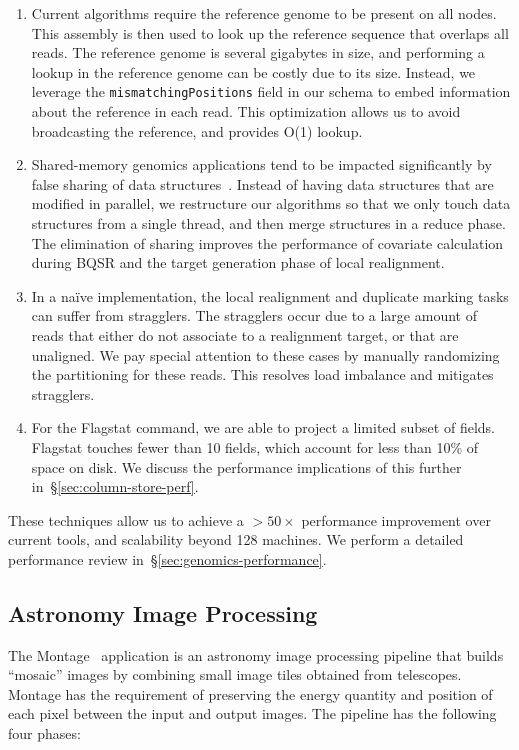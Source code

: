\documentclass{acm_proc_article-sp}
\begin{document}
\begin{enumerate}
\item Current algorithms require the reference genome to be present on all nodes. This assembly is then used to
look up the reference sequence that overlaps all reads. The reference genome is several gigabytes in
size, and performing a lookup in the reference genome can be costly due to its size. Instead, we leverage
the \texttt{mismatchingPositions} field in our schema to embed information about the reference in each read. This
optimization allows us to avoid broadcasting the reference, and provides O(1) lookup.
\item Shared-memory genomics applications tend to be impacted significantly by false sharing of data
\linebreak structures~\cite{zaharia11}. Instead of having data structures that are modified in parallel, we
restructure our algorithms so that we only touch data structures from a single thread, and then merge
structures in a reduce phase. The elimination of sharing improves the performance of covariate calculation during
BQSR and the target generation phase of local realignment.
\item In a na\"{i}ve implementation, the local realignment and duplicate marking tasks can suffer from
stragglers. The stragglers occur due to a large amount of reads that either do not associate to a realignment
target, or that are unaligned. We pay special attention to these cases by manually randomizing the
partitioning for these reads. This resolves load imbalance and mitigates stragglers.
\item For the Flagstat command, we are able to project a limited subset of fields. Flagstat touches fewer
than 10 fields, which account for less than 10\% of space on disk. We discuss the performance
implications of this further in~\S\ref{sec:column-store-perf}.
\end{enumerate}

These techniques allow us to achieve a $>50\times$ performance improvement over current tools, and
scalability beyond 128 machines. We perform a detailed performance review
in~\S\ref{sec:genomics-performance}.

\subsection{Astronomy Image Processing}
\label{sec:astronomy-image-processing}

The Montage~\cite{montage} application is an astronomy image processing pipeline that builds ``mosaic'' images
by combining small image tiles obtained from telescopes. Montage has the requirement of preserving the energy
quantity and position of each pixel between the input and output images. The pipeline has the following four
phases:
\end{document}

